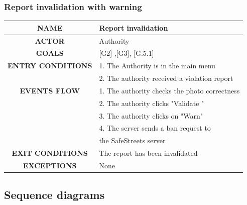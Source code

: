 \documentclass[12pt,a4paper]{article}
\begin{document}
\subsubsection{Report invalidation with warning}
		\begin{center}
			\begin{tabular}{| c | l |}
				\hline
				\textbf{NAME} & Report invalidation \\
				\hline
				\textbf{ACTOR} & Authority \\
				\hline
				\textbf{GOALS} & [G2] ,[G3], [G.5.1] \\
				\hline
				\textbf{ENTRY CONDITIONS} &1. The Authority is in the main menu \\
				&2. The authority received a violation report \\ \hline
				\textbf{EVENTS FLOW}  &
				1. The authority checks the photo correctness\\
				&2. The authority clicks "Validate " \\
				&3. The authority clicks on "Warn"  \\
				&4. The server sends a ban request to \\
				& the SafeStreets server \\
				\hline
				\textbf{EXIT CONDITIONS}  & The report has been invalidated \\ \hline
				\textbf{EXCEPTIONS} & None \\
				\hline
			\end{tabular}
		\end{center}

\subsection{Sequence diagrams}
\end{document}
